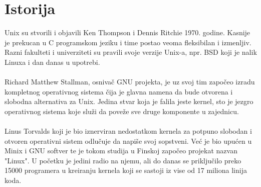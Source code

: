 \documentclass[a4paper,14pt]{article}
\begin{document}
\section{Istorija}
Unix su stvorili i objavili Ken Thompson i Dennis Ritchie 1970. godine. Kasnije je prekucan u C programskom jeziku i time postao veoma fleksibilan i izmenljiv. Razni fakulteti i univerziteti su pravili svoje verzije Unix-a, npr. BSD koji je nalik Linuxa i dan danas u upotrebi.
\\\\
Richard Matthew Stallman, osnivač GNU projekta, je uz svoj tim započeo izradu kompletnog operativnog sistema čija je glavna namena da bude otvorena i slobodna alternativa za Unix. Jedina stvar koja je falila jeste kernel, sto je jezgro operativnog sistema koje služi da poveže sve druge komponente u zajednicu.
\\\\
Linus Torvalds koji je bio iznerviran nedostatkom kernela za potpuno slobodan i otvoren operativni sistem odlučuje da napiše svoj sopstveni. Već je bio upućen u Minix i GNU softver te je tokom studija u Finskoj započeo projekat nazvan "Linux". U početku je jedini radio na njemu, ali do danas se priključilo preko 15000 programera u kreiranju kernela koji se sastoji iz vise od 17 miliona linija koda.
\\\\
\begin{figure}[h]
	\centering
    \hspace{1cm}
\end{figure}
\end{document}

